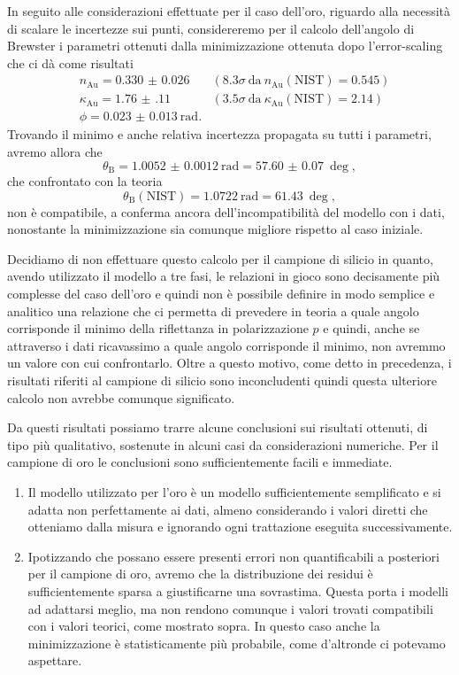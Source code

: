 \documentclass[
    prb,altaffilletter,citeautoscript,
    amsmath,amssymb,
    showpacs,showkeys,floatfix,
    reprint
]{revtex4-1}
\begin{document}
In seguito alle considerazioni effettuate per il caso dell'oro, riguardo alla necessità di scalare le incertezze sui punti, considereremo per il calcolo dell'angolo di Brewster i parametri ottenuti dalla minimizzazione ottenuta dopo l'error-scaling che ci dà come risultati \begin{align*}
    & n_\mathrm{Au}=  \num{0.330(26)} \quad& (8.3\sigma~\mathrm{da}~n_\mathrm{Au}(\mathrm{NIST}) = \num{0.545})\\
    & \kappa_\mathrm{Au}=  \num{1.76(11)} \quad& (3.5\sigma~\mathrm{da}~\kappa_\mathrm{Au}(\mathrm{NIST}) = \num{2.14})\\
    & \phi =  \SI{0.023(13)}{\radian}. 
\end{align*} Trovando il minimo e anche relativa incertezza propagata su tutti i parametri, avremo allora che \[\theta_\mathrm{B} = \SI{1.0052(12)}{\radian} = \SI{57.60(7)}{\deg},\] che confrontato con la teoria \[\theta_\mathrm{B}(\mathrm{NIST}) = \SI{1.0722}{\radian} = \SI{61.43}{\deg},\] non è compatibile, a conferma ancora dell'incompatibilità del modello con i dati, nonostante la minimizzazione sia comunque migliore rispetto al caso iniziale.

Decidiamo di non effettuare questo calcolo per il campione di silicio in quanto, avendo utilizzato il modello a tre fasi, le relazioni in gioco sono decisamente più complesse del caso dell'oro e quindi non è possibile definire in modo semplice e analitico una relazione che ci permetta di prevedere in teoria a quale angolo corrisponde il minimo della riflettanza in polarizzazione $p$ e quindi, anche se attraverso i dati ricavassimo a quale angolo corrisponde il minimo, non avremmo un valore con cui confrontarlo. Oltre a questo motivo, come detto in precedenza, i risultati riferiti al campione di silicio sono inconcludenti quindi questa ulteriore calcolo non avrebbe comunque significato.

Da questi risultati possiamo trarre alcune conclusioni sui risultati ottenuti, di tipo più qualitativo, sostenute in alcuni casi da considerazioni numeriche. Per il campione di oro le conclusioni sono sufficientemente facili e immediate. \begin{enumerate}
    \item Il modello utilizzato per l'oro è un modello sufficientemente semplificato e si adatta non perfettamente ai dati, almeno considerando i valori diretti che otteniamo dalla misura e ignorando ogni trattazione eseguita successivamente. 
    \item Ipotizzando che possano essere presenti errori non quantificabili a posteriori per il campione di oro, avremo che la distribuzione dei residui è sufficientemente sparsa a giustificarne una sovrastima. Questa porta i modelli ad adattarsi meglio, ma non rendono comunque i valori trovati compatibili con i valori teorici, come mostrato sopra. In questo caso anche la minimizzazione è statisticamente più probabile, come d'altronde ci potevamo aspettare. 
\end{enumerate}
\end{document}
